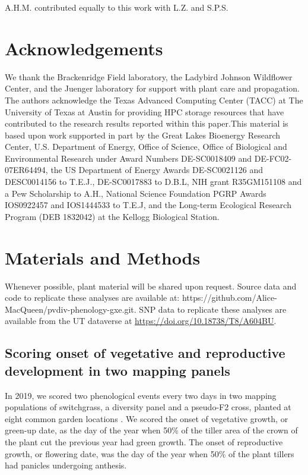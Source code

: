 \documentclass[
  9pt,
  twocolumn,
  twoside]{simple-article}%
\begin{document}
A.H.M. contributed equally to this work with L.Z. and S.P.S.

\section{Acknowledgements}\label{acknowledgements}

We thank the Brackenridge Field laboratory, the Ladybird Johnson
Wildflower Center, and the Juenger laboratory for support with plant
care and propagation. The authors acknowledge the Texas Advanced
Computing Center (TACC) at The University of Texas at Austin for
providing HPC storage resources that have contributed to the research
results reported within this paper.This material is based upon work
supported in part by the Great Lakes Bioenergy Research Center, U.S.
Department of Energy, Office of Science, Office of Biological and
Environmental Research under Award Numbers DE-SC0018409 and
DE-FC02-07ER64494, the US Department of Energy Awards DE-SC0021126 and
DESC0014156 to T.E.J., DE-SC0017883 to D.B.L, NIH grant R35GM151108 and
a Pew Scholarship to A.H., National Science Foundation PGRP Awards
IOS0922457 and IOS1444533 to T.E.J, and the Long-term Ecological
Research Program (DEB 1832042) at the Kellogg Biological Station.

\section{Materials and Methods}\label{materials-and-methods}

Whenever possible, plant material will be shared upon request. Source
data and code to replicate these analyses are available at:
https://github.com/Alice-MacQueen/pvdiv-phenology-gxe.git. SNP data to
replicate these analyses are available from the UT dataverse at
\url{https://doi.org/10.18738/T8/A604BU}.

\subsection{Scoring onset of vegetative and reproductive development in
two mapping
panels}\label{scoring-onset-of-vegetative-and-reproductive-development-in-two-mapping-panels}

In 2019, we scored two phenological events every two days in two mapping
populations of switchgrass, a diversity panel and a pseudo-F2 cross,
planted at eight common garden locations
\citep{lovell2021, milano2016genetic, lowry2019qtl}. We scored the onset
of vegetative growth, or green-up date, as the day of the year when 50\%
of the tiller area of the crown of the plant cut the previous year had
green growth. The onset of reproductive growth, or flowering date, was
the day of the year when 50\% of the plant tillers had panicles
undergoing anthesis.
\end{document}
